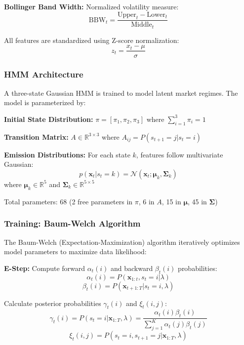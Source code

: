 \documentclass[conference]{IEEEtran}
\begin{document}
\textbf{Bollinger Band Width:} Normalized volatility measure:
\begin{equation}
\text{BBW}_t = \frac{\text{Upper}_t - \text{Lower}_t}{\text{Middle}_t}
\end{equation}

All features are standardized using Z-score normalization:
\begin{equation}
z_t = \frac{x_t - \mu}{\sigma}
\end{equation}

\subsubsection{HMM Architecture}
A three-state Gaussian HMM is trained to model latent market regimes. The model is parameterized by:

\textbf{Initial State Distribution:} $\pi = [\pi_1, \pi_2, \pi_3]$ where $\sum_{i=1}^{3}\pi_i = 1$

\textbf{Transition Matrix:} $A \in \mathbb{R}^{3 \times 3}$ where $A_{ij} = P(s_{t+1}=j | s_t=i)$

\textbf{Emission Distributions:} For each state $k$, features follow multivariate Gaussian:
\begin{equation}
p(\mathbf{x}_t | s_t=k) = \mathcal{N}(\mathbf{x}_t; \boldsymbol{\mu}_k, \boldsymbol{\Sigma}_k)
\end{equation}
where $\boldsymbol{\mu}_k \in \mathbb{R}^5$ and $\boldsymbol{\Sigma}_k \in \mathbb{R}^{5 \times 5}$

Total parameters: 68 (2 free parameters in $\pi$, 6 in $A$, 15 in $\boldsymbol{\mu}$, 45 in $\boldsymbol{\Sigma}$)

\subsubsection{Training: Baum-Welch Algorithm}
The Baum-Welch (Expectation-Maximization) algorithm iteratively optimizes model parameters to maximize data likelihood:

\textbf{E-Step:} Compute forward $\alpha_t(i)$ and backward $\beta_t(i)$ probabilities:
\begin{equation}
\alpha_t(i) = P(\mathbf{x}_{1:t}, s_t=i | \lambda)
\end{equation}
\begin{equation}
\beta_t(i) = P(\mathbf{x}_{t+1:T} | s_t=i, \lambda)
\end{equation}

Calculate posterior probabilities $\gamma_t(i)$ and $\xi_t(i,j)$:
\begin{equation}
\gamma_t(i) = P(s_t=i | \mathbf{x}_{1:T}, \lambda) = \frac{\alpha_t(i)\beta_t(i)}{\sum_{j=1}^{K}\alpha_t(j)\beta_t(j)}
\end{equation}
\begin{equation}
\xi_t(i,j) = P(s_t=i, s_{t+1}=j | \mathbf{x}_{1:T}, \lambda)
\end{equation}
\end{document}
